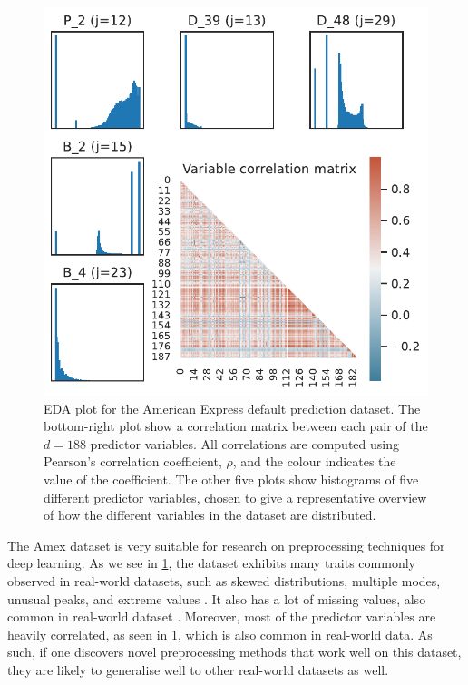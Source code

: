 \documentclass{statsmsc}
\begin{document}
{%
\begin{figure}
\begin{center}
    \includegraphics[scale=1]{figures/amex_data_eda_plot.pdf}
\end{center}
\caption{
    \ac{EDA} plot for the American Express default prediction
    dataset.  The bottom-right plot show a correlation matrix between each pair
    of the $d=188$ predictor variables. All correlations are computed using
    Pearson's correlation coefficient, $\rho$, and the colour indicates the
    value of the coefficient.  The other five plots show histograms of five
    different predictor variables, chosen to give a representative overview of
    how the different variables in the dataset are distributed.
}
\label{fig:amex_eda}
\end{figure}


The Amex dataset is very suitable for research on preprocessing techniques for
deep learning. As we see in \cref{fig:amex_eda}, the dataset exhibits many traits commonly observed in
real-world datasets, such as skewed distributions, multiple modes, unusual
peaks, and extreme values \citep{nawi}. It also has a lot of missing values, also common in
real-world dataset \citep{nawi, brits}. Moreover, most of the predictor variables are heavily
correlated, as seen in \cref{fig:amex_eda}, which is also common in real-world data.
As such, if one discovers novel preprocessing methods that
work well on this dataset, they are likely to generalise well to other real-world datasets as well.

}
\end{document}
